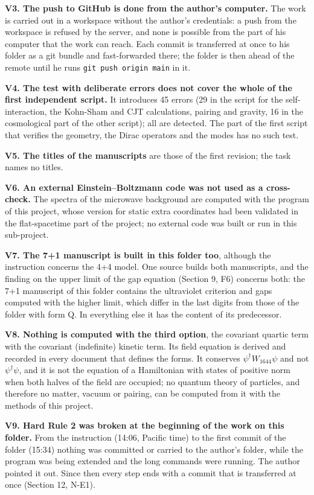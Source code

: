 \documentclass[
  10pt,
]{article}
\begin{document}
\textbf{V3. The push to GitHub is done from the author's computer.} The
work is carried out in a workspace without the author's credentials: a
push from the workspace is refused by the server, and none is possible
from the part of his computer that the work can reach. Each commit is
transferred at once to his folder as a git bundle and fast-forwarded
there; the folder is then ahead of the remote until he runs
\texttt{git\ push\ origin\ main} in it.

\textbf{V4. The test with deliberate errors does not cover the whole of
the first independent script.} It introduces 45 errors (29 in the script
for the self-interaction, the Kohn-Sham and CJT calculations, pairing
and gravity, 16 in the cosmological part of the other script); all are
detected. The part of the first script that verifies the geometry, the
Dirac operators and the modes has no such test.

\textbf{V5. The titles of the manuscripts} are those of the first
revision; the task names no titles.

\textbf{V6. An external Einstein--Boltzmann code was not used as a
cross-check.} The spectra of the microwave background are computed with
the program of this project, whose version for static extra coordinates
had been validated in the flat-spacetime part of the project; no
external code was built or run in this sub-project.

\textbf{V7. The 7+1 manuscript is built in this folder too}, although
the instruction concerns the 4+4 model. One source builds both
manuscripts, and the finding on the upper limit of the gap equation
(Section 9, F6) concerns both: the 7+1 manuscript of this folder
contains the ultraviolet criterion and gaps computed with the higher
limit, which differ in the last digits from those of the folder with
form Q. In everything else it has the content of its predecessor.

\textbf{V8. Nothing is computed with the third option}, the covariant
quartic term with the covariant (indefinite) kinetic term. Its field
equation is derived and recorded in every document that defines the
forms. It conserves \(\psi^\dagger W_{1644}\psi\) and not
\(\psi^\dagger\psi\), and it is not the equation of a Hamiltonian with
states of positive norm when both halves of the field are occupied; no
quantum theory of particles, and therefore no matter, vacuum or pairing,
can be computed from it with the methods of this project.

\textbf{V9. Hard Rule 2 was broken at the beginning of the work on this
folder.} From the instruction (14:06, Pacific time) to the first commit
of the folder (15:34) nothing was committed or carried to the author's
folder, while the program was being extended and the long commands were
running. The author pointed it out. Since then every step ends with a
commit that is transferred at once (Section 12, N-E1).
\end{document}

